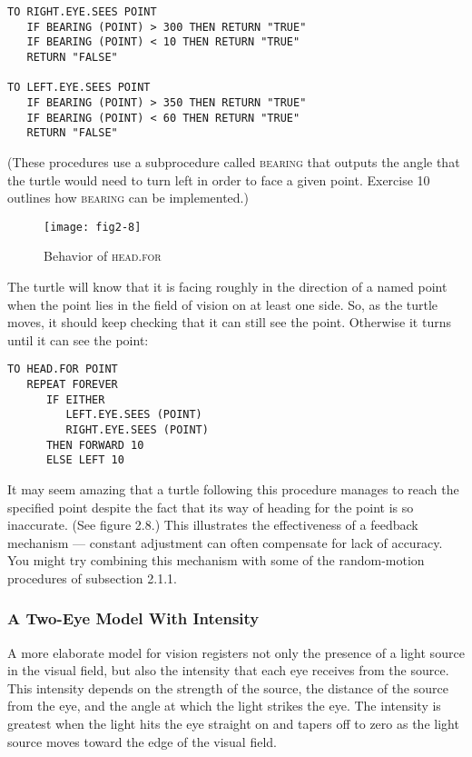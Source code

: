 \documentclass{book}
\begin{document}
\begin{verbatim}
TO RIGHT.EYE.SEES POINT
   IF BEARING (POINT) > 300 THEN RETURN "TRUE"
   IF BEARING (POINT) < 10 THEN RETURN "TRUE"
   RETURN "FALSE"

TO LEFT.EYE.SEES POINT
   IF BEARING (POINT) > 350 THEN RETURN "TRUE"
   IF BEARING (POINT) < 60 THEN RETURN "TRUE"
   RETURN "FALSE"
\end{verbatim}
\noindent (These procedures use a subprocedure called \textsc{bearing} that outputs the
angle that the turtle would need to turn left in order to face a given
point. Exercise 10 outlines how \textsc{bearing} can be implemented.)


\begin{figure}
\begin{center}
\texttt{[image: fig2-8]}
\caption{Behavior of \textsc{head}\textsc{.for}}
\end{center}
\end{figure}

The turtle will know that it is facing roughly in the direction of a
named point when the point lies in the field of vision on at least one
side. So, as the turtle moves, it should keep checking that it can still
see the point. Otherwise it turns until it can see the point:

\begin{verbatim}
TO HEAD.FOR POINT
   REPEAT FOREVER
      IF EITHER
         LEFT.EYE.SEES (POINT)
         RIGHT.EYE.SEES (POINT)
      THEN FORWARD 10
      ELSE LEFT 10
\end{verbatim}
It may seem amazing that a turtle following this procedure manages to
reach the specified point despite the fact that its way of heading for the
point is so inaccurate. (See figure 2.8.) This illustrates the effectiveness
of a feedback mechanism --- constant adjustment can often compensate
for lack of accuracy. You might try combining this mechanism with
some of the random-motion procedures of subsection 2.1.1.

\subsubsection{A Two-Eye Model With Intensity}

A more elaborate model for vision registers not only the presence of
a light source in the visual field, but also the intensity that each eye
receives from the source. This intensity depends on the strength of the
source, the distance of the source from the eye, and the angle at which
the light strikes the eye. The intensity is greatest when the light hits the
eye straight on and tapers off to zero as the light source moves toward
the edge of the visual field.
\end{document}
